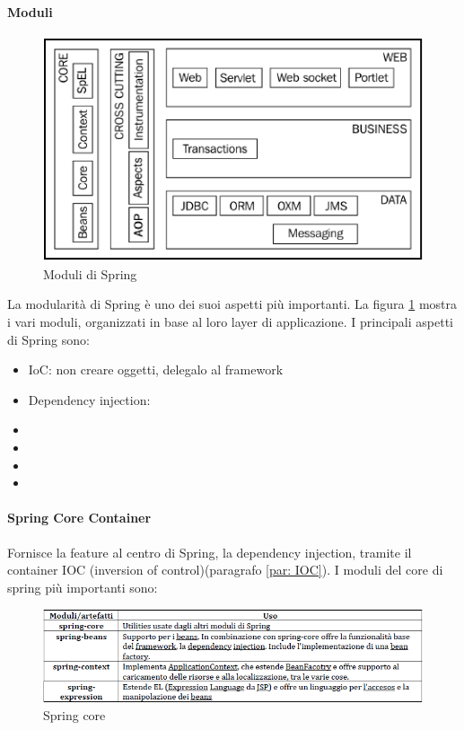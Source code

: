 \documentclass[11pt,a4paper]{book}
\begin{document}
\paragraph{Moduli}
\begin{figure}[h!]
	\begin{center}
		\includegraphics[scale=0.6]{img/019.png}
		\caption{Moduli di Spring}
		\label{fig: 019}
	\end{center}
\end{figure}
La modularità di Spring è uno dei suoi aspetti più importanti. La figura \ref{fig: 019} mostra i vari moduli, organizzati in base al loro layer di applicazione.
I principali aspetti di Spring sono:
\begin{itemize}
	\item IoC: non creare oggetti, delegalo al framework
	\item Dependency injection: 
	\item 
	\item 
	\item 
	\item 
\end{itemize}
\paragraph{Spring Core Container}
Fornisce la feature al centro di Spring, la dependency injection, tramite il container IOC (inversion of control)(paragrafo \ref{par: IOC}). I moduli del core di spring più importanti sono:
\begin{figure}[h!]
	\begin{center}
		\includegraphics[scale=0.6]{img/020.png}
		\caption{Spring core}
		\label{fig: 020}
	\end{center}
\end{figure}
\end{document}
